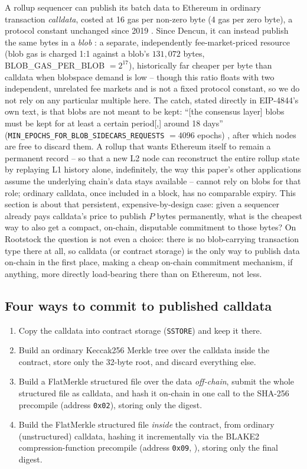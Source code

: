 A rollup sequencer can publish its batch data to Ethereum in ordinary
transaction \emph{calldata}, costed at 16 gas per non-zero byte (4 gas per
zero byte), a protocol constant unchanged since 2019
\citep{eip2028}. Since Dencun, it can instead publish the same bytes in a
\emph{blob} \citep{eip4844}: a separate, independently fee-market-priced
resource (blob gas is charged 1:1 against a blob's $131{,}072$ bytes,
BLOB\_GAS\_PER\_BLOB $=2^{17}$), historically far cheaper per byte than
calldata when blobspace demand is low -- though this ratio floats with two
independent, unrelated fee markets and is not a fixed protocol constant, so
we do not rely on any particular multiple here. The catch, stated directly
in EIP-4844's own text, is that blobs are not meant to be kept: ``[the
consensus layer] blobs must be kept for at least a certain period[,] around
18 days'' (\texttt{MIN\_EPOCHS\_FOR\_BLOB\_SIDECARS\_REQUESTS}
$=4096$ epochs) \citep{eip4844}, after which nodes are free to discard
them. A rollup that wants Ethereum itself to remain a permanent record --
so that a new L2 node can reconstruct the entire rollup state by replaying
L1 history alone, indefinitely, the way this paper's other applications
assume the underlying chain's data stays available -- cannot rely on
blobs for that role; ordinary calldata, once included in a block, has no
comparable expiry. This section is about that persistent, expensive-by-design
case: given a sequencer already pays calldata's price to publish $P$ bytes
permanently, what is the cheapest way to also get a compact, on-chain,
disputable commitment to those bytes? On Rootstock the question is not even
a choice: there is no blob-carrying transaction type there at all, so
calldata (or contract storage) is the only way to publish data on-chain in
the first place, making a cheap on-chain commitment mechanism, if anything,
more directly load-bearing there than on Ethereum, not less.

\subsection{Four ways to commit to published calldata}
\label{sec:rollup-eth-options}

\begin{enumerate}
\item[A.] Copy the calldata into contract storage (\texttt{SSTORE}) and
  keep it there.
\item[B.] Build an ordinary Keccak256 Merkle tree over the calldata inside
  the contract, store only the 32-byte root, and discard everything else.
\item[C.] Build a FlatMerkle structured file over the data \emph{off-chain},
  submit the whole structured file as calldata, and hash it on-chain in one
  call to the SHA-256 precompile (address \texttt{0x02}), storing only the
  digest.
\item[D.] Build the FlatMerkle structured file \emph{inside} the contract,
  from ordinary (unstructured) calldata, hashing it incrementally via the
  BLAKE2 compression-function precompile (address \texttt{0x09},
  \citep{eip152}), storing only the final digest.
\end{enumerate}

